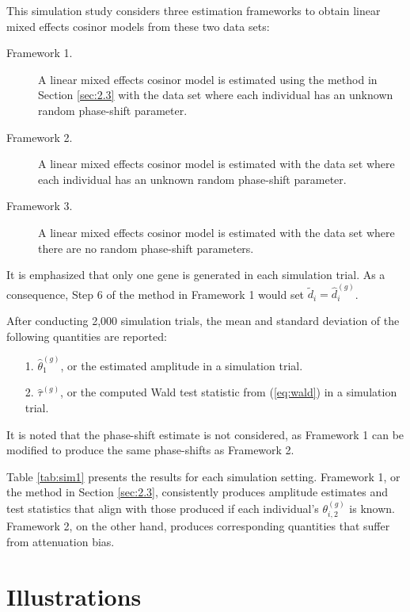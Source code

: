This simulation study considers three estimation frameworks to obtain linear mixed effects cosinor models from these two data sets:
\begin{description}
    \item[Framework 1.] A linear mixed effects cosinor model is estimated using the method in Section \ref{sec:2.3} with the data set where each individual has an unknown random phase-shift parameter.
    \item[Framework 2.] A linear mixed effects cosinor model is estimated with the data set where each individual has an unknown random phase-shift parameter.
    \item[Framework 3.] A linear mixed effects cosinor model is estimated with the data set where there are no random phase-shift parameters. 
 \end{description}
It is emphasized that only one gene is generated in each simulation trial. As a consequence, Step 6 of the method in Framework 1 would set $\tilde{d}_{i} = \hat{d}^{(g)}_{i}$. 

After conducting 2,000 simulation trials, the mean and standard deviation of the following quantities are reported:
\begin{itemize}
    \item[1.] $\hat{\theta}_1^{(g)}$, or the estimated amplitude in a simulation trial.
    \item[2.] $\hat{\tau}^{(g)}$, or the computed Wald test statistic from (\ref{eq:wald}) in a simulation trial.
\end{itemize} 
It is noted that the phase-shift estimate is not considered, as Framework 1 can be modified to produce the same phase-shifts as Framework 2.

Table \ref{tab:sim1} presents the results for each simulation setting. Framework 1, or the method in Section \ref{sec:2.3}, consistently produces amplitude estimates and test statistics that align with those produced if each individual's $\theta_{i,2}^{(g)}$ is known. Framework 2, on the other hand, produces corresponding quantities that suffer from attenuation bias. 


\section{Illustrations} \label{sec:4}

